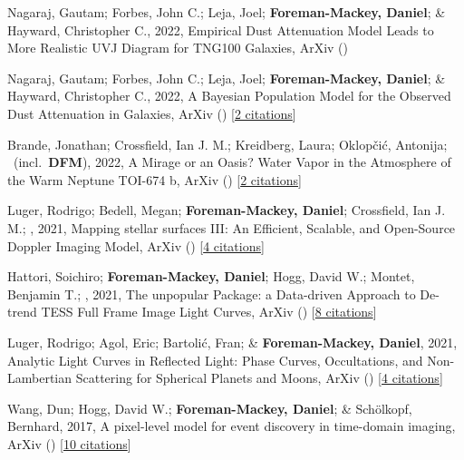 \item[{\color{numcolor}\scriptsize10}] Nagaraj, Gautam; Forbes, John C.; Leja, Joel; \textbf{Foreman-Mackey, Daniel}; \& Hayward, Christopher C., 2022, Empirical Dust Attenuation Model Leads to More Realistic UVJ Diagram for TNG100 Galaxies, ArXiv ()

\item[{\color{numcolor}\scriptsize9}] Nagaraj, Gautam; Forbes, John C.; Leja, Joel; \textbf{Foreman-Mackey, Daniel}; \& Hayward, Christopher C., 2022, A Bayesian Population Model for the Observed Dust Attenuation in Galaxies, ArXiv () [\href{https://ui.adsabs.harvard.edu/abs/2022arXiv220205102N}{2 citations}]

\item[{\color{numcolor}\scriptsize8}] Brande, Jonathan; Crossfield, Ian J. M.; Kreidberg, Laura; Oklop{\v{c}}i{\'c}, Antonija; \etal\ (incl.\ \textbf{DFM}), 2022, A Mirage or an Oasis? Water Vapor in the Atmosphere of the Warm Neptune TOI-674 b, ArXiv () [\href{https://ui.adsabs.harvard.edu/abs/2022arXiv220104197B}{2 citations}]

\item[{\color{numcolor}\scriptsize7}] Luger, Rodrigo; Bedell, Megan; \textbf{Foreman-Mackey, Daniel}; Crossfield, Ian J. M.; \etal, 2021, Mapping stellar surfaces III: An Efficient, Scalable, and Open-Source Doppler Imaging Model, ArXiv () [\href{https://ui.adsabs.harvard.edu/abs/2021arXiv211006271L}{4 citations}]

\item[{\color{numcolor}\scriptsize6}] Hattori, Soichiro; \textbf{Foreman-Mackey, Daniel}; Hogg, David W.; Montet, Benjamin T.; \etal, 2021, The unpopular Package: a Data-driven Approach to De-trend TESS Full Frame Image Light Curves, ArXiv () [\href{https://ui.adsabs.harvard.edu/abs/2021arXiv210615063H}{8 citations}]

\item[{\color{numcolor}\scriptsize5}] Luger, Rodrigo; Agol, Eric; Bartoli{\'c}, Fran; \& \textbf{Foreman-Mackey, Daniel}, 2021, Analytic Light Curves in Reflected Light: Phase Curves, Occultations, and Non-Lambertian Scattering for Spherical Planets and Moons, ArXiv () [\href{https://ui.adsabs.harvard.edu/abs/2021arXiv210306275L}{4 citations}]

\item[{\color{numcolor}\scriptsize4}] Wang, Dun; Hogg, David W.; \textbf{Foreman-Mackey, Daniel}; \& Sch{\"o}lkopf, Bernhard, 2017, A pixel-level model for event discovery in time-domain imaging, ArXiv () [\href{https://ui.adsabs.harvard.edu/abs/2017arXiv171002428W}{10 citations}]


